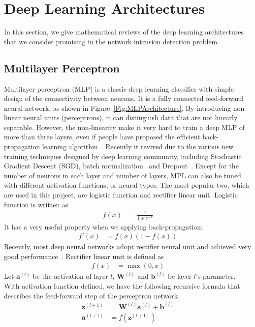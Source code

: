 \section{Deep Learning Architectures}
\label{Sec:Architectures}
In this section, we give mathematical reviews of the deep learning architectures that
we consider promising in the network intrusion detection problem.

\subsection{Multilayer Perceptron}
Multilayer perceptron (MLP) is a classic deep learning classifier with simple
design of the connectivity between neurons.
It is a fully connected feed-forward neural network, as shown in Figure~\ref{Fig:MLPArchitecture}.
By introducing non-linear neural units (perceptrons), it can distinguish data that are
not linearly separable.
However, the non-linearity make it very hard to train a deep MLP of more than three layers,
even if people have proposed the efficient back-propagation learning algorithm~\cite{Backpropagation}.
Recently it revived due to the various new training techniques designed by deep learning community,
including Stochastic Gradient Descent (SGD),
batch normalization~\cite{BatchNorm} and Dropout~\cite{Dropout}.
Except for the number of neurons in each layer and number of layers,
MPL can also be tuned with different activation functions, or neural types.
The most popular two, which are used in this project, are logistic function
and rectifier linear unit.
Logistic function is written as
\begin{align}
    f(x) &= \frac{1}{1 + e^{-x}}
\end{align}
It has a very useful property when we applying back-propagation:
\begin{align}
    f'(x) &= f(x) (1-f(x))
\end{align}
Recently, most deep neural networks adopt rectifier neural unit and
achieved very good performance~\cite{DeepLearning}.
Rectifier linear unit is defined as
\begin{align}
    f(x) &= \max(0, x)
\end{align}
Let $\mathbf{a}^{(l)}$ be the activation of layer $l$,
$\mathbf{W}^{(l)}$ and $\mathbf{b}^{(l)}$ be layer $l$'s parameter.
With activation function defined, we have the following recursive formula that describes
the feed-forward step of the perceptron network.
\begin{align}
    \mathbf{z}^{(l+1)} &= \mathbf{W}^{(l)} \mathbf{a}^{(l)} + \mathbf{b}^{(l)} \label{Equ:MLPFeedForward1}\\
    \mathbf{a}^{(l+1)} &= f(\mathbf{z}^{(l+1)})
    \label{Equ:MLPFeedForward2}
\end{align}

